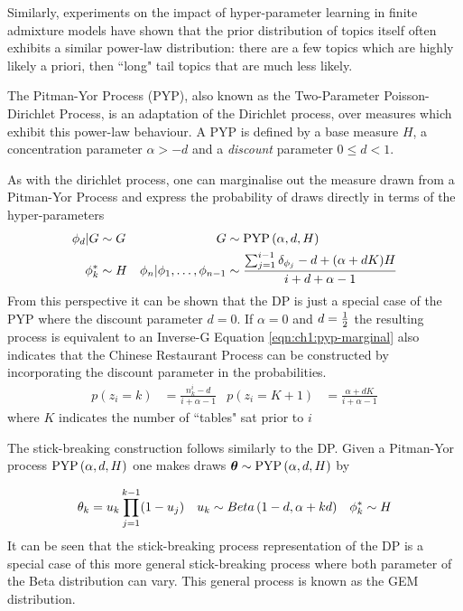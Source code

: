 Similarly, experiments on the impact of hyper-parameter learning in finite admixture models have shown that the prior distribution of topics itself often exhibits a similar power-law distribution: there are a few topics which are highly likely a priori, then ``long" tail topics that are  much less likely\cite{Wallach2009a}.

The Pitman-Yor Process (PYP), also known as the Two-Parameter Poisson-Dirichlet Process, is an adaptation of the Dirichlet process, over measures which exhibit this power-law behaviour. A PYP is defined by a base measure $H$, a concentration parameter $\alpha > -d$ and a \emph{discount} parameter $0 \leq d < 1$. 

As with the dirichlet process, one can marginalise out the measure drawn from a Pitman-Yor Process and express the probability of draws directly in terms of the hyper-parameters
\begin{align}
\phi_d|G & \sim G &
G & \sim \text{PYP} \left( {\alpha, d, H} \right) \\
\phi^*_k &\sim H &
\phi_n | \phi_1, \ldots, \phi_{n-1} & \sim 
    \frac{\sum_{j=1}^{i-1} \delta_{\phi_j} - d + (\alpha + dK) H}{i + d + \alpha - 1} \label{eqn:ch1:pyp-marginal}
\end{align}
From this perspective it can be shown that the DP is just a special case of the PYP where the discount parameter $d=0$. If $\alpha = 0$ and $d=\frac{1}{2}$ the resulting process is equivalent to an Inverse-G Equation \eqref{eqn:ch1:pyp-marginal} also indicates that the Chinese Restaurant Process can be constructed by incorporating the discount parameter in the probabilities.
\begin{align}
p(z_i = k) & = \frac{n^i_k - d}{i + \alpha - 1} &
p(z_i = K + 1) & = \frac{\alpha + dK}{i + \alpha - 1}
\end{align}
where $K$ indicates the number of ``tables" sat prior to $i$


The stick-breaking construction follows similarly to the DP. Given a Pitman-Yor process $\text{PYP} \left( {\alpha, d, H} \right)$ one makes draws $\bm \theta \sim \text{PYP} \left( {\alpha, d,H} \right)$ by

\begin{align}
\theta_k & = u_k \prod_{j=1}^{k-1} (1 - u_j) &
u_k & \sim Beta \left( {1-d}, {\alpha + kd} \right) &
\phi^*_k \sim H
\end{align}
It can be seen that the stick-breaking process representation of the DP is a special case of this more general stick-breaking process where both parameter of the Beta distribution can vary. This general process is known as the GEM distribution\cite{Pitman2002}.



